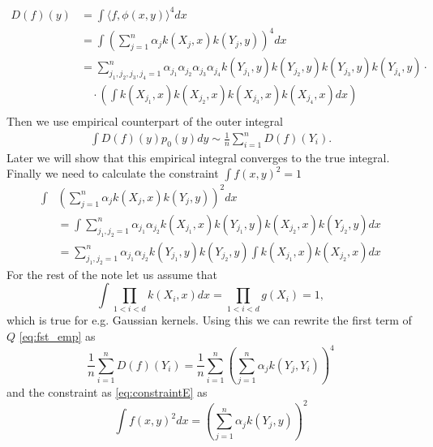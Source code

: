 \documentclass[10pt]{article}
\begin{document}
\begin{align}
D(f)(y) &=  \int \langle f,\phi(x,y) \rangle^4 dx \\
&=\int \left( \sum_{j=1}^{n} \alpha_j k(X_j,x) k(Y_j,y) \right)^4 dx \\
&=  \sum_{j_1,j_2,j_3,j_4=1}^n  \alpha_{j_1} \alpha_{j_2} \alpha_{j_3} \alpha_{j_4}  k(Y_{j_1},y) k(Y_{j_2},y)k(Y_{j_3},y)k(Y_{j_4},y) \cdot\\
  &\quad \cdot   \left( \int k(X_{j_1},x) k(X_{j_2},x) k(X_{j_3},x) k(X_{j_4},x)  dx \right) \\
\end{align}
Then we use empirical counterpart of the outer integral 
\begin{align}
\label{eq:fst_emp}
 \int D(f)(y) p_0(y) dy \sim  \frac 1 n \sum_{i=1}^{n} D(f)(Y_i).
\end{align}
Later we will show  that this empirical integral converges to the true integral. Finally we need to calculate the constraint $\int f(x,y)^2=1$ 
\begin{align}
\label{eq:constraint}
 \int& \left( \sum_{j=1}^{n} \alpha_j  k(X_{j},x)  k(Y_{j},y) \right )^2 dx \\ 
 &= \int  \sum_{j_1,j_2=1}^{n} \alpha_{j_1} \alpha_{j_2}  k(X_{j_1},x)  k(Y_{j_1},y) k(X_{j_2},x)  k(Y_{j_2},y)  dx\\
 &=   \sum_{j_1,j_2=1}^{n} \alpha_{j_1} \alpha_{j_2}  k(Y_{j_1},y)  k(Y_{j_2},y) \int  k(X_{j_1},x)  k(X_{j_2},x)    dx  \label{eq:constraintE}
\end{align}
For the rest of the note let us assume that  
$$
\int \prod_{1<i<d} k(X_i,x) dx   = \prod_{1<i<d}  g(X_i) =1, 
$$
which is true for e.g. Gaussian kernels. Using this we can rewrite the first term of $Q$ \eqref{eq:fst_emp} as
\begin{equation}
 \frac 1 n \sum_{i=1}^{n} D(f)(Y_i) =  \frac 1 n \sum_{i=1}^{n} \left( \sum_{j=1}^{n} \alpha_j k(Y_j,Y_i)  \right)^4
\end{equation}
and the constraint as \eqref{eq:constraintE} as
\begin{equation}
\label{eq:const2}
\int f(x,y)^2 dx=  \left( \sum_{j=1}^{n} \alpha_j    k(Y_{j},y) \right )^2 
\end{equation}
\end{document}
